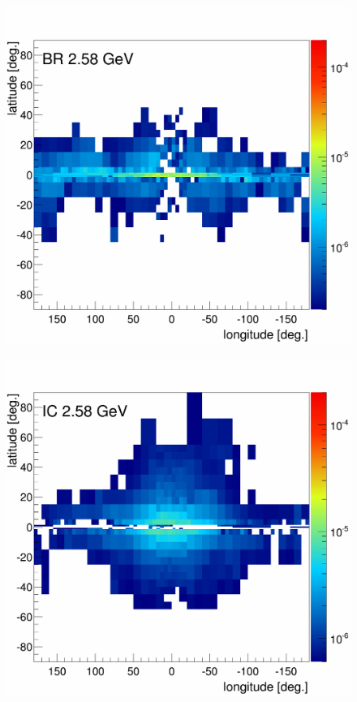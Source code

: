 \newpage
\begin{figure}[h]
  \centering
  \begin{minipage}[h]{0.45\textwidth}
  	\centering
	\includegraphics[width=1.\linewidth]{pic/results/MCRonly_BR_fluxE12_skymap.png}
  	\label{fig:MCRonly_skymap_BR}
  \end{minipage}
  \hfill
  \begin{minipage}[h]{0.45\textwidth}
  	\centering
	\includegraphics[width=1.\linewidth]{pic/results/MCRonly_IC_fluxE12_skymap.png}

\end{minipage}
\end{figure}
